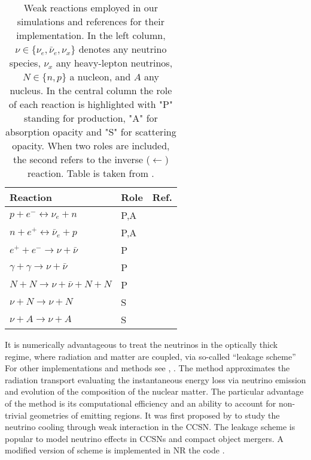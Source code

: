 \begin{table}
    \caption{
        Weak reactions employed in our simulations and references for their implementation.
        In the left column, $\nu \in \{\nu_e, \bar{\nu}_e, \nu_{x}\}$ denotes any neutrino species, 
        $\nu_{x}$ any heavy-lepton neutrinos, $N \in\{n, p\}$ a nucleon, and $A$ any nucleus.
        In the central column the role of each reaction is highlighted with "P" standing for 
        production, "A" for absorption opacity and "S" for scattering opacity.
        When two roles are included, the second refers to the inverse ($\leftarrow$) reaction.
        Table is taken from \citet{Radice:2018pdn}.
    }
    \label{tab:leakage}
    \begin{center}
        \begin{tabular}{l l l}
            \hline\hline
            Reaction & Role &  Ref. \\ 
            \hline
            $p + e^- \leftrightarrow \nu_e + n $          & P,A & \citep{Bruenn:1985}  \\
            $n + e^+ \leftrightarrow \bar{\nu}_{e} + p $  & P,A & \citep{Bruenn:1985}  \\
            $e^+ + e^- \rightarrow \nu + \bar{\nu}$       & P   & \citep{Ruffert:1995fs} \\
            $\gamma + \gamma \rightarrow \nu + \bar{\nu}$ & P   & \citep{Ruffert:1995fs} \\
            $N + N \rightarrow \nu + \bar{\nu} + N  + N$  & P   & \citep{Burrows:2004vq} \\
            $\nu + N \rightarrow \nu + N$                 & S   & \citep{Ruffert:1995fs} \\
            $\nu + A \rightarrow \nu + A$                 & S   & \citep{Shapiro:1983du} \\
            \hline\hline
        \end{tabular}
    \end{center}
\end{table}

It is numerically advantageous to treat the neutrinos in the optically 
thick regime, where radiation and matter are coupled, via 
so-called ``leakage scheme'' 
%
\citep{Ruffert:1995fs,Rosswog:2003rv,Sekiguchi:2010zz,OConnor:2009iuz,Galeazzi:2013mia}
%
For other implementations and methods see \eg, 
\citet{vanRiper:1981mko,Ruffert:1995fs,Rosswog:2003rv,OConnor:2009iuz,Sekiguchi:2010ep,
    Neilsen:2014hha,Perego:2015agy,Ardevol-Pulpillo:2018btx}.
%
The method approximates the radiation transport evaluating the instantaneous energy loss 
via neutrino emission and evolution of the composition of the nuclear matter.
The particular advantage of the method is its computational efficiency and an ability 
to account for non-trivial geometries of emitting regions.
%
It was first proposed by \citet{vanRiper:1981mko} to study the neutrino cooling through weak interaction 
in the \ac{CCSN}. The leakage scheme is popular to model neutrino effects in \acp{CCSN} 
and compact object mergers.
%
A modified version of \citet{Galeazzi:2013mia} scheme is implemented in 
\ac{NR} the code \wisky{} \citep{Radice:2016dwd,Radice:2018pdn}.

